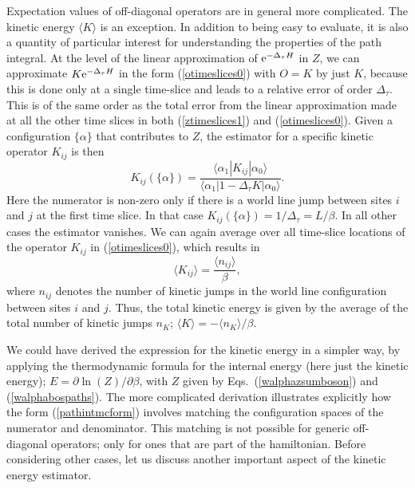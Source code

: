 \documentclass[draft,numberedheadings]{aipproc}
\begin{document}
Expectation values of off-diagonal operators are in general more complicated. The kinetic energy $\langle K\rangle$ is an exception. In addition to being
easy to evaluate, it is also a quantity of particular interest for understanding the properties of the path integral. At the level of the linear approximation 
of ${\rm e}^{-\Delta_\tau H}$ in $Z$, we can approximate $K{\rm e}^{-\Delta_\tau H}$ in the form (\ref{otimeslices0}) with $O=K$ by just $K$, because this is done 
only at a single time-slice and leads to a relative error of order $\Delta_\tau$. This is of the same order as the total error from the linear approximation made 
at all the other time slices in both (\ref{ztimeslices1}) and (\ref{otimeslices0}). Given a configuration $\{\alpha\}$ that contributes to $Z$, the estimator 
for a specific kinetic operator $K_{ij}$ is then
\begin{equation}
K_{ij}(\{\alpha\}) = \frac{\langle \alpha_1|K_{ij}|\alpha_0 \rangle}{\langle \alpha_1|1-\Delta_\tau K|\alpha_0 \rangle}.
\label{kijpathestim0}
\end{equation}
Here the numerator is non-zero only if there is a world line jump between sites $i$ and $j$ at the first time slice. In that case 
$K_{ij}(\{\alpha\})=1/\Delta_\tau=L/\beta$. In all other cases the estimator vanishes. We can again average over all time-slice locations of the operator
$K_{ij}$ in (\ref{otimeslices0}), which results in
\begin{equation}
\langle K_{ij}\rangle = \frac{\langle n_{ij}\rangle}{\beta},
\label{kijpathestim}
\end{equation}
where $n_{ij}$ denotes the number of kinetic jumps in the world line configuration between sites $i$ and $j$. Thus, the total kinetic energy is
given by the average of the total number of kinetic jumps $n_K$; $\langle K\rangle = -\langle n_K\rangle/\beta$. 

We could have derived the expression for the kinetic energy in a simpler way, by applying the thermodynamic formula for the internal energy 
(here just the kinetic energy); $E=\partial \ln(Z)/\partial \beta$, with $Z$ given by Eqs.~(\ref{walphazsumboson}) and (\ref{walphabospaths}). 
The more complicated derivation illustrates explicitly how the form (\ref{pathintmcform}) involves matching the configuration spaces of the numerator and 
denominator. This matching is not possible for generic off-diagonal operators; only for ones that are part of the hamiltonian. Before considering other cases, 
let us discuss another important aspect of the kinetic energy estimator.
\end{document}
